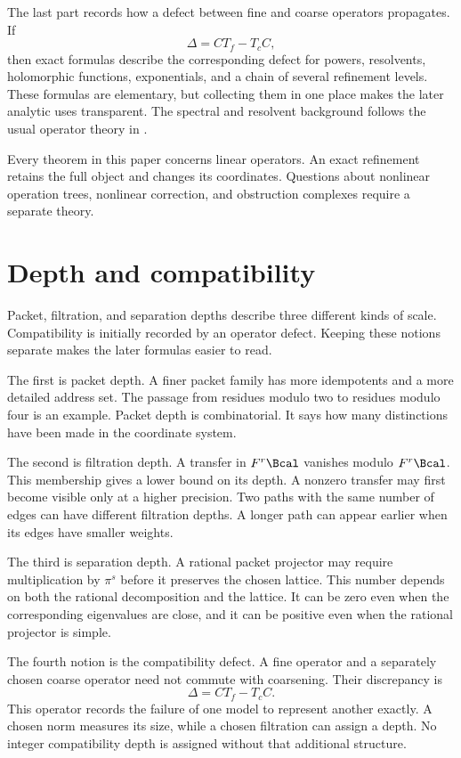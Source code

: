 The last part records how a defect between fine and coarse operators propagates.  If
\[
\Delta=CT_f-T_cC,
\]
then exact formulas describe the corresponding defect for powers, resolvents, holomorphic functions, exponentials, and a chain of several refinement levels.  These formulas are elementary, but collecting them in one place makes the later analytic uses transparent.  The spectral and resolvent background follows the usual operator theory in \cite{Kato1995}.

Every theorem in this paper concerns linear operators. An exact refinement retains the full object and changes its coordinates. Questions about nonlinear operation trees, nonlinear correction, and obstruction complexes require a separate theory.

\section{Depth and compatibility}\label{sec:four_depths}

Packet, filtration, and separation depths describe three different kinds of scale. Compatibility is initially recorded by an operator defect. Keeping these notions separate makes the later formulas easier to read.

The first is packet depth.  A finer packet family has more idempotents and a more detailed address set.  The passage from residues modulo two to residues modulo four is an example.  Packet depth is combinatorial.  It says how many distinctions have been made in the coordinate system.

The second is filtration depth. A transfer in $F^r\Bcal$ vanishes modulo $F^r\Bcal$. This membership gives a lower bound on its depth. A nonzero transfer may first become visible only at a higher precision. Two paths with the same number of edges can have different filtration depths. A longer path can appear earlier when its edges have smaller weights.

The third is separation depth.  A rational packet projector may require multiplication by $\pi^s$ before it preserves the chosen lattice.  This number depends on both the rational decomposition and the lattice.  It can be zero even when the corresponding eigenvalues are close, and it can be positive even when the rational projector is simple.

The fourth notion is the compatibility defect. A fine operator and a separately chosen coarse operator need not commute with coarsening. Their discrepancy is
\[
\Delta=CT_f-T_cC.
\]
This operator records the failure of one model to represent another exactly. A chosen norm measures its size, while a chosen filtration can assign a depth. No integer compatibility depth is assigned without that additional structure.


